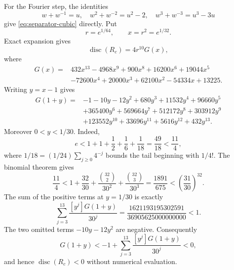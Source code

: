 For the Fourier step, the identities
\[
 w+w^{-1}=u,\quad w^2+w^{-2}=u^2-2,\quad
 w^3+w^{-3}=u^3-3u
\]
give \eqref{eq:separator-cubic} directly. Put
\[
 r=e^{1/64},\qquad x=r^2=e^{1/32}.
\]
Exact expansion gives
\[
 \operatorname{disc}(R_c)=4r^{10}G(x),
\]
where
\begin{align*}
G(x)={}&432x^{13}-4968x^9+900x^8+16200x^6+19044x^5\\
&-72600x^4+20000x^3+62100x^2-54334x+13225.
\end{align*}
Writing \(y=x-1\) gives
\begin{align*}
G(1+y)={}&-1-10y-12y^2+680y^3+11532y^4+96660y^5\\
&+365400y^6+569664y^7+512172y^8+303912y^9\\
&+123552y^{10}+33696y^{11}+5616y^{12}+432y^{13}.
\end{align*}
Moreover \(0<y<1/30\). Indeed,
\[
 e<1+1+\frac12+\frac16+\frac1{18}
 =\frac{49}{18}<\frac{11}{4},
\]
where \(1/18=(1/24)\sum_{j\geq0}4^{-j}\) bounds the tail beginning with
\(1/4!\). The binomial theorem gives
\[
 \frac{11}{4}<1+\frac{32}{30}
 +\frac{\binom{32}{2}}{30^2}+\frac{\binom{32}{3}}{30^3}
 =\frac{1891}{675}<\left(\frac{31}{30}\right)^{32}.
\]
The sum of the positive terms at \(y=1/30\) is exactly
\[
 \sum_{j=3}^{13}\frac{[y^j]G(1+y)}{30^j}
 =\frac{1621193195302591}{36905625000000000}<1.
\]
The two omitted terms \(-10y-12y^2\) are negative. Consequently
\[
 G(1+y)<-1+
 \sum_{j=3}^{13}\frac{[y^j]G(1+y)}{30^j}<0,
\]
and hence \(\operatorname{disc}(R_c)<0\) without numerical evaluation.
